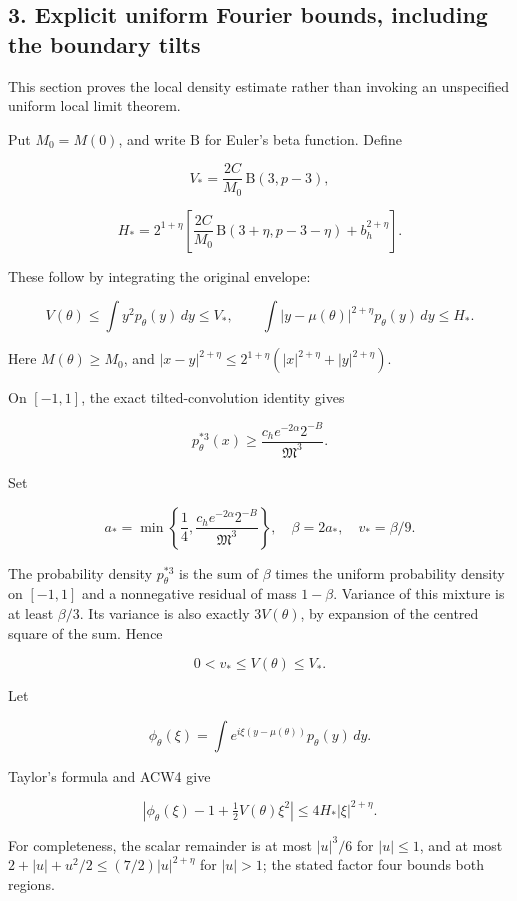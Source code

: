 \subsection{3. Explicit uniform Fourier bounds, including the boundary tilts}\label{acw:explicit-uniform-fourier-bounds-including-the-boundary-tilts}

This section proves the local density estimate rather than invoking an unspecified uniform local limit theorem.

Put \(M_0=M(0)\), and write \(\mathrm B\) for Euler's beta function. Define

\[
V_* = \frac{2C}{M_0}\,\mathrm B(3,p-3),
\]

\[
H_* = 2^{1+\eta}\left[
\frac{2C}{M_0}\,\mathrm B(3+\eta,p-3-\eta)
+b_h^{2+\eta}\right].
\tag{ACW4}
\]

These follow by integrating the original envelope:

\[
V(\theta)\le\int y^2p_\theta(y)\,dy\le V_*,
\qquad
\int|y-\mu(\theta)|^{2+\eta}p_\theta(y)\,dy\le H_*.
\]

Here \(M(\theta)\ge M_0\), and
\(|x-y|^{2+\eta}\le2^{1+\eta}(|x|^{2+\eta}+|y|^{2+\eta})\).

On \([-1,1]\), the exact tilted-convolution identity gives

\[
p_\theta^{*3}(x)\ge
\frac{c_h e^{-2\alpha}2^{-B}}{\mathfrak M^3}.
\]

Set

\[
a_* = \min\left\{\frac14,
\frac{c_h e^{-2\alpha}2^{-B}}{\mathfrak M^3}\right\},
\quad \beta=2a_*,\quad v_* = \beta/9.
\tag{ACW5}
\]

The probability density \(p_\theta^{*3}\) is the sum of \(\beta\) times the uniform probability density on \([-1,1]\) and a nonnegative residual of mass \(1-\beta\). Variance of this mixture is at least \(\beta/3\). Its variance is also exactly \(3V(\theta)\), by expansion of the centred square of the sum. Hence

\[
0<v_*\le V(\theta)\le V_*.
\]

Let

\[
\phi_\theta(\xi)=\int e^{i\xi(y-\mu(\theta))}p_\theta(y)\,dy.
\]

Taylor's formula and ACW4 give

\[
\left|\phi_\theta(\xi)-1+\tfrac12V(\theta)\xi^2\right|
\le4H_*|\xi|^{2+\eta}.
\tag{ACW6}
\]

For completeness, the scalar remainder is at most \(|u|^3/6\) for \(|u|\le1\), and at most \(2+|u|+u^2/2\le(7/2)|u|^{2+\eta}\) for \(|u|>1\); the stated factor four bounds both regions.

